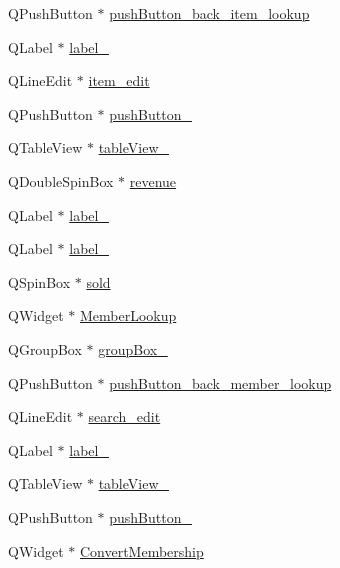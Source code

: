 \begin{DoxyCompactItemize}
Q\+Push\+Button $\ast$ \hyperlink{class_ui___main_window_accde12cb3cab904b76c9fdc3dd4d342c}{push\+Button\+\_\+back\+\_\+item\+\_\+lookup}
\item 
Q\+Label $\ast$ \hyperlink{class_ui___main_window_a4f12a71b4a2fb6f85df2300d83b5ed3e}{label\+\_}
\item 
Q\+Line\+Edit $\ast$ \hyperlink{class_ui___main_window_a8bd92ef45646190fd67193831fefc527}{item\+\_\+edit}
\item 
Q\+Push\+Button $\ast$ \hyperlink{class_ui___main_window_a048bd3b46acbadff6e94f1638545e477}{push\+Button\+\_}
\item 
Q\+Table\+View $\ast$ \hyperlink{class_ui___main_window_af096999bec659529a970667e698a1a4e}{table\+View\+\_}
\item 
Q\+Double\+Spin\+Box $\ast$ \hyperlink{class_ui___main_window_affb3e3c80ce947b7dd648058be44c78a}{revenue}
\item 
Q\+Label $\ast$ \hyperlink{class_ui___main_window_aa2621565827195e88436fb54220bb48d}{label\+\_}
\item 
Q\+Label $\ast$ \hyperlink{class_ui___main_window_ac1cbc41e9dbaeb3d0bdc2189d8e9ee1d}{label\+\_}
\item 
Q\+Spin\+Box $\ast$ \hyperlink{class_ui___main_window_ae0e53dac9376e26930503ba630e9f0a3}{sold}
\item 
Q\+Widget $\ast$ \hyperlink{class_ui___main_window_af012044a2e7e0a7232dd606edd178903}{Member\+Lookup}
\item 
Q\+Group\+Box $\ast$ \hyperlink{class_ui___main_window_a3f71b587164e5b20352f1e838e3321cc}{group\+Box\+\_}
\item 
Q\+Push\+Button $\ast$ \hyperlink{class_ui___main_window_a30671819e9e4985e5452be5e0cf991d8}{push\+Button\+\_\+back\+\_\+member\+\_\+lookup}
\item 
Q\+Line\+Edit $\ast$ \hyperlink{class_ui___main_window_a8ab03462047a8e5176d4bab7e01ecb6e}{search\+\_\+edit}
\item 
Q\+Label $\ast$ \hyperlink{class_ui___main_window_a9dc4dba26b83e0c94aa566e1c564420b}{label\+\_}
\item 
Q\+Table\+View $\ast$ \hyperlink{class_ui___main_window_a922f8b861682d7eb2dc7b723a2c3e6cc}{table\+View\+\_}
\item 
Q\+Push\+Button $\ast$ \hyperlink{class_ui___main_window_aeb282560fc662a1c9caf4e519f5e6ac0}{push\+Button\+\_}
\item 
Q\+Widget $\ast$ \hyperlink{class_ui___main_window_a16fec64f3f12ec7a394dfc9c8e9c5ae3}{Convert\+Membership}

\end{DoxyCompactItemize}
